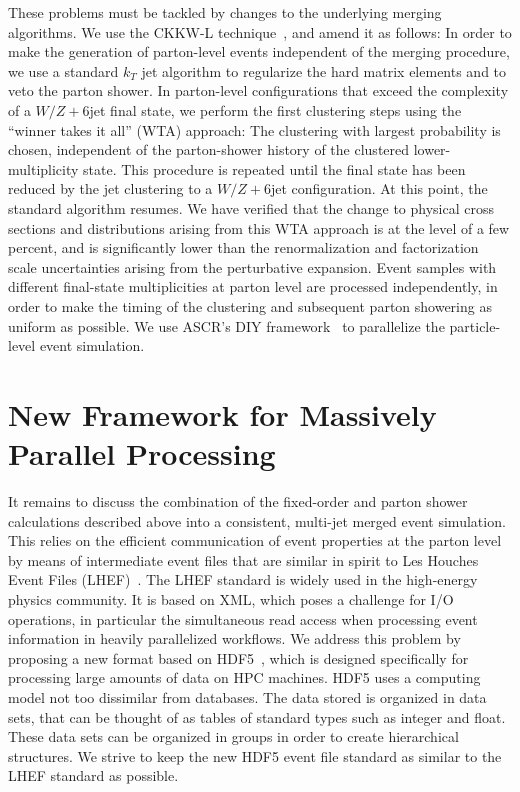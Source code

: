 \documentclass[aps,prd,twocolumn,fleqn,superscriptaddress,groupedaddress,nofootinbib,preprintnumbers]{revtex4}
\begin{document}
These problems must be tackled by changes to the underlying merging algorithms.
We use the CKKW-L technique~\cite{Lonnblad:2001iq}, and amend it as follows:
In order to make the generation of parton-level events independent
of the merging procedure, we use a standard $k_T$ jet algorithm
to regularize the hard matrix elements and to veto the parton shower.
In parton-level configurations that exceed the complexity of a
$W/Z+6$jet final state, we perform the first clustering steps using the
``winner takes it all'' (WTA) approach: The clustering with largest
probability is chosen, independent of the parton-shower history of
the clustered lower-multiplicity state.
This procedure is repeated until the final state has been reduced by the
jet clustering to a $W/Z+6$jet configuration. At this point, the standard
algorithm resumes. We have verified that the change to physical cross
sections and distributions arising from this WTA approach is at the level
of a few percent, and is significantly lower than the renormalization and
factorization scale uncertainties arising from the perturbative expansion.
Event samples with different final-state multiplicities at parton level
are processed independently, in order to make the timing of the clustering
and subsequent parton showering as uniform as possible.
We use ASCR's DIY framework~\cite{peterka_ldav11,morozov_ldav16}
to parallelize the particle-level event simulation.

\section{New Framework for Massively Parallel Processing}
\label{sec:framework}
It remains to discuss the combination of the fixed-order and parton shower
calculations described above into a consistent, multi-jet merged event simulation.
This relies on the efficient communication of event properties at the parton level
by means of intermediate event files that are similar in spirit to Les Houches
Event Files (LHEF)~\cite{Alwall:2006yp}. The LHEF standard is widely used in the
high-energy physics community. It is based on XML, which poses a challenge 
for I/O operations, in particular the simultaneous read access when processing
event information in heavily parallelized workflows. We address this problem
by proposing a new format based on HDF5~\cite{HDF5}, which is designed specifically
for processing large amounts of data on HPC machines. HDF5 uses a computing model
not too dissimilar from databases. The data stored is organized in data sets,
that can be thought of as tables of standard types such as integer and float.
These data sets can be organized in groups in order to create hierarchical structures.
We strive to keep the new HDF5 event file standard as similar to the LHEF standard
as possible.
\end{document}
